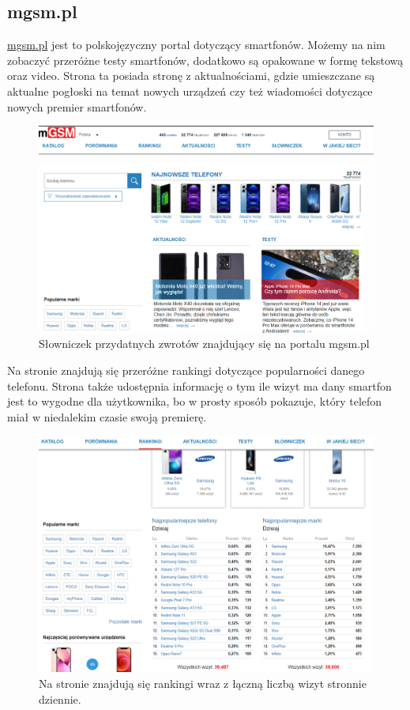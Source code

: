 \subsection{mgsm.pl}
\href{https://www.mgsm.pl/pl/}{mgsm.pl} \cite{mgsm} jest to polskojęzyczny portal dotyczący smartfonów. Możemy na nim zobaczyć przeróżne testy smartfonów, dodatkowo są opakowane w formę tekstową oraz video. Strona ta posiada stronę z aktualnościami, gdzie umieszczane są aktualne pogłoski na temat nowych urządzeń czy też wiadomości dotyczące nowych premier smartfonów.
\begin{figure}[H]
    \centering
    \includegraphics[width=15cm]{img/mgsm/mgsm.png}
    \caption{Słowniczek przydatnych zwrotów znajdujący się na portalu mgsm.pl}
    \label{mgsm}
\end{figure}
Na stronie znajdują się przeróżne rankingi dotyczące popularności danego telefonu. Strona także udostępnia informację o tym ile wizyt ma dany smartfon jest to wygodne dla użytkownika, bo w prosty sposób pokazuje, który telefon miał w niedalekim czasie swoją premierę.
\begin{figure}[H]
    \centering
    \includegraphics[width=15cm]{img/mgsm/rankingsMgsm.png}
    \caption{Na stronie znajdują się rankingi wraz z łączną liczbą wizyt stronnie dziennie.}
    \label{mgsm_1}
\end{figure}
